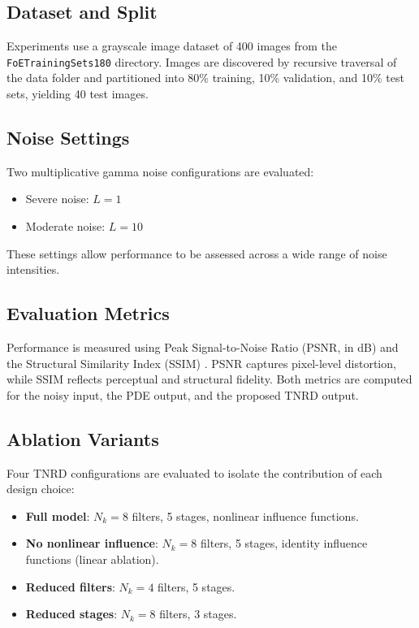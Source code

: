 \documentclass[conference]{IEEEtran}
\begin{document}
\subsection{Dataset and Split}
Experiments use a grayscale image dataset of 400 images from the
\texttt{FoETrainingSets180} directory. Images are discovered by recursive
traversal of the data folder and partitioned into 80\% training, 10\% validation,
and 10\% test sets, yielding 40 test images.

\subsection{Noise Settings}
Two multiplicative gamma noise configurations are evaluated:
\begin{itemize}
  \item Severe noise: $L = 1$
  \item Moderate noise: $L = 10$
\end{itemize}
These settings allow performance to be assessed across a wide range of noise
intensities.

\subsection{Evaluation Metrics}
Performance is measured using Peak Signal-to-Noise Ratio (PSNR, in dB) and the
Structural Similarity Index (SSIM) \cite{wang2004ssim}. PSNR captures pixel-level
distortion, while SSIM reflects perceptual and structural fidelity. Both metrics
are computed for the noisy input, the PDE output, and the proposed TNRD output.

\subsection{Ablation Variants}
Four TNRD configurations are evaluated to isolate the contribution of each design
choice:
\begin{itemize}
  \item \textbf{Full model}: $N_k = 8$ filters, 5 stages, nonlinear influence
        functions.
  \item \textbf{No nonlinear influence}: $N_k = 8$ filters, 5 stages, identity
        influence functions (linear ablation).
  \item \textbf{Reduced filters}: $N_k = 4$ filters, 5 stages.
  \item \textbf{Reduced stages}: $N_k = 8$ filters, 3 stages.
\end{itemize}
\end{document}

